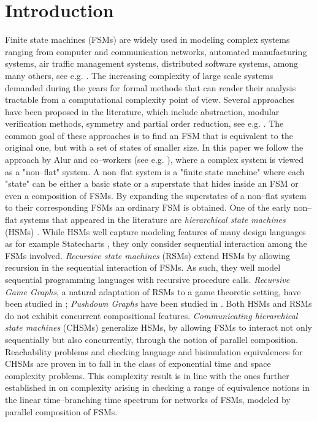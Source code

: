 \documentclass{amsart}
\theoremstyle{definition}
\theoremstyle{remark}
\numberwithin{equation}{section}
\begin{document}
\section{Introduction}
Finite state machines (FSMs) are widely used in modeling complex systems ranging from computer and communication networks, automated manufacturing systems, air traffic management systems, distributed software systems, among many others, see e.g. \cite{cassandras,ModelChecking}. 
The increasing complexity of large scale systems demanded during the years for formal methods that can render their analysis tractable from a computational complexity point of view. Several approaches have been proposed in the literature, which include abstraction, modular verification methods, symmetry and partial order reduction, see e.g. \cite{ModelChecking}. The common goal of these approaches is to find an FSM that is equivalent to the original one, but with a set of states of smaller size. 
In this paper we follow the approach by Alur and co--workers (see e.g. \cite{HFSM1,CHSM}), where a complex system is viewed as a "non--flat" system. 
A non--flat system is a "finite state machine" where each "state" can be either a basic state or a superstate \cite{statecharts} that hides inside an FSM or even a composition of FSMs. By expanding the superstates of a non--flat system to their corresponding FSMs an ordinary FSM is obtained. One of the early non--flat systems that appeared in the literature are \textit{hierarchical state machines} (HSMs) \cite{HFSM1}. 
While HSMs well capture modeling features of many design languages as for example Statecharts \cite{statecharts}, they only consider sequential interaction among the FSMs involved. \textit{Recursive state machines} (RSMs) \cite{RFSM} extend HSMs by allowing recursion in the sequential interaction of FSMs. As such, they well model sequential programming languages with recursive procedure calls. 
\textit{Recursive Game Graphs}, a natural adaptation of RSMs to a game theoretic setting, have been studied in \cite{Etessami2004}; \textit{Pushdown Graphs} have been studied in \cite{Cachat2002a}. 
Both HSMs and RSMs do not exhibit concurrent compositional features. \textit{Communicating hierarchical state machines} (CHSMs) \cite{CHSM} generalize HSMs, by allowing FSMs to interact not only sequentially but also concurrently, through the notion of parallel composition. Reachability problems and checking language and bisimulation equivalences for CHSMs are proven in \cite{CHSM} to fall in the class of exponential time and space complexity problems. This complexity result is in line with the ones further established in \cite{StateExplosion2,StateExplosion1} on  complexity arising in checking a range of equivalence notions in the linear time--branching time spectrum \cite{Spectrum} for networks of FSMs, modeled by parallel composition of FSMs. 
\end{document}
